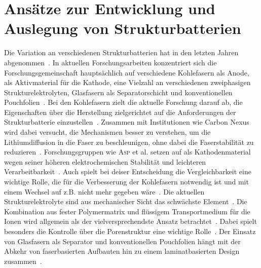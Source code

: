 \section{Ansätze zur Entwicklung und Auslegung von Strukturbatterien}
Die Variation an verschiedenen Strukturbatterien hat in den letzten Jahren abgenommen~\cite{Asp2024}. In aktuellen Forschungsarbeiten konzentriert sich die Forschungsgemeinschaft hauptsächlich auf verschiedene Kohlefasern als Anode,  als Aktivmaterial für die Kathode, eine Vielzahl an verschiedenen zweiphasigen Strukturelektrolyten, Glasfasern als Separatorschicht und konventionellen Pouchfolien~\cite{Asp2021,Jin2023, Asp2024,Chaudhary2024}. Bei den Kohlefasern zielt die aktuelle Forschung darauf ab, die Eigenschaften über die Herstellung zielgerichtet auf die Anforderungen der Strukturbatterie einzustellen~\cite{Asp2024}. Zusammen mit Institutionen wie Carbon Nexus wird dabei versucht, die Mechanismen besser zu verstehen, um die Lithiumdiffusion in die Faser zu beschleunigen, ohne dabei die Faserstabilität zu reduzieren~\cite{Duan2021,Larsson2023,Johansen2024,Asp2024}. Forschungsgruppen wie \textsc{Asp} et al. setzen auf  als Kathodenmaterial wegen seiner höheren elektrochemischen Stabilität und leichteren Verarbeitbarkeit~\cite{Asp2021, Siraj2023, Ye2024, Chaudhary2024}. Auch spielt bei deiser Entscheidung die Vergleichbarkeit eine wichtige Rolle, die für die Verbesserung der Kohlefasern notwendig ist und mit einem Wechsel auf z.B.  nicht mehr gegeben wäre~\cite{Asp2024}. Die aktuellen Strukturelektrolyte sind aus mechanischer Sicht das schwächste Element~\cite{Lee2019,Jin2023}. Die Kombination aus fester Polymermatrix und flüssigem Transportmedium für die Ionen wird allgemein als der vielversprechendste Ansatz betrachtet~\cite{Lee2019,Asp2021, Greenhalgh2023}. Dabei spielt besonders die Kontrolle über die Porenstruktur eine wichtige Rolle~\cite{Lee2019}. Der Einsatz von Glasfasern als Separator und konventionellen Pouchfolien hängt mit der Abkehr von faserbasierten Aufbauten hin zu einem laminatbasierten Design zusammen~\cite{Zhao2020,Xu2022}.

